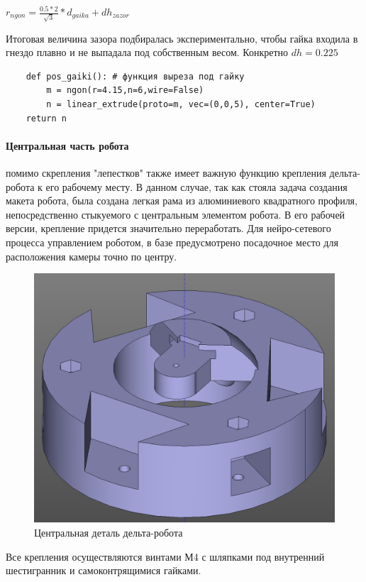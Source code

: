 \begin{center}
    $r_{ngon} = \frac{0.5*2}{\sqrt{3}}*d_{gaika} + dh_{zazor}$
\end{center}

Итоговая величина зазора подбиралась экспериментально, чтобы гайка входила в гнездо плавно и не выпадала под собственным весом. Конкретно $dh=0.225$

\begin{verbatim}
    def pos_gaiki(): # функция выреза под гайку
        m = ngon(r=4.15,n=6,wire=False)
        n = linear_extrude(proto=m, vec=(0,0,5), center=True)
    return n
\end{verbatim}

\paragraph{Центральная часть робота} помимо скрепления "лепестков" также имеет важную функцию крепления дельта-робота к его рабочему месту. В данном случае, так как стояла задача создания макета робота, была создана легкая рама из алюминиевого квадратного профиля, непосредственно стыкуемого с центральным элементом робота. В его рабочей версии, крепление придется значительно переработать.
Для нейро-сетевого процесса управлением роботом, в базе предусмотрено посадочное место для расположения камеры точно по центру.  
 
\begin{figure}[h!]
	\centering
	\includegraphics[width=0.8\linewidth]{./image/baza}
	\caption{Центральная деталь дельта-робота}
\end{figure} 

Все крепления осуществляются винтами М4 с шляпками под внутренний шестигранник и самоконтрящимися гайками.

